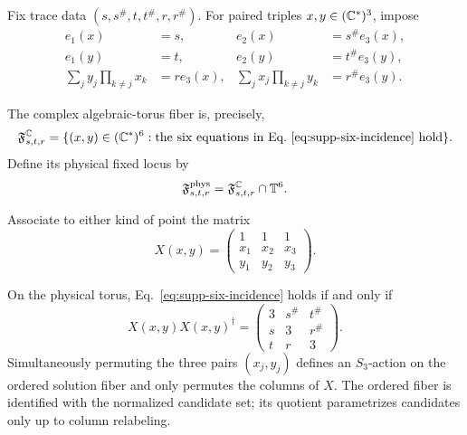 Fix trace data $(s,s^\#,t,t^\#,r,r^\#)$.
For paired triples $x,y\in(\mathbb C^*)^3$, impose
\begin{equation}
\begin{aligned}
e_1(x)&=s,& e_2(x)&=s^\#e_3(x),\\
e_1(y)&=t,& e_2(y)&=t^\#e_3(y),\\
\sum_jy_j\!\prod_{k\ne j}x_k&=re_3(x),&
\sum_jx_j\!\prod_{k\ne j}y_k&=r^\#e_3(y).
\end{aligned}
\label{eq:supp-six-incidence}
\end{equation}

The complex algebraic-torus fiber is, precisely,
\begin{equation}
\mathfrak F^{\mathbb C}_{s,t,r}
=\{(x,y)\in(\mathbb C^*)^6:\text{the six equations in
Eq.~\eqref{eq:supp-six-incidence} hold}\}.
\label{eq:supp-complex-fiber}
\end{equation}
Define its physical fixed locus by
\begin{equation}
\mathfrak F^{\mathrm{phys}}_{s,t,r}
=\mathfrak F^{\mathbb C}_{s,t,r}\cap\mathbb T^6.
\label{eq:supp-physical-fiber}
\end{equation}

Associate to either kind of point the matrix
\begin{equation}
X(x,y)=\begin{pmatrix}1&1&1\\x_1&x_2&x_3\\y_1&y_2&y_3\end{pmatrix}.
\label{eq:supp-X}
\end{equation}


\begin{lemma}
\label{lem:supp-incidence-gram}
On the physical torus, Eq.~\eqref{eq:supp-six-incidence} holds if and only if
\begin{equation}
X(x,y)X(x,y)^\dagger=
\begin{pmatrix}3&s^\#&t^\#\\s&3&r^\#\\t&r&3\end{pmatrix}.
\label{eq:supp-Xgram}
\end{equation}
Simultaneously permuting the three pairs $(x_j,y_j)$ defines an $S_3$-action on the ordered solution fiber and only permutes the columns of $X$. The ordered fiber is identified with the normalized candidate set; its quotient parametrizes candidates only up to column relabeling.
\end{lemma}

